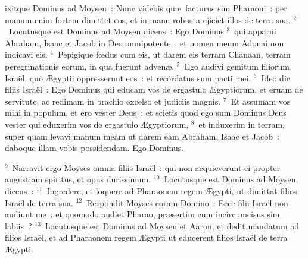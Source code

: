 \bchapter
{}ixitque Dominus ad Moysen~: Nunc videbis qu\ae\ facturus sim Pharaoni~: per manum enim fortem dimittet eos, et in manu robusta ejiciet illos de terra sua.
${}^{2}$~Locutusque est Dominus ad Moysen dicens~: Ego Dominus
${}^{3}$~qui apparui Abraham, Isaac et Jacob in Deo omnipotente~: et nomen meum Adonai non indicavi eis.
${}^{4}$~Pepigique fœdus cum eis, ut darem eis terram Chanaan, terram peregrinationis eorum, in qua fuerunt adven\ae .
${}^{5}$~Ego audivi gemitum filiorum Isra\"el, quo \AE gyptii oppresserunt eos~: et recordatus sum pacti mei.
${}^{6}$~Ideo dic filiis Isra\"el~: Ego Dominus qui educam vos de ergastulo \AE gyptiorum, et eruam de servitute, ac redimam in brachio excelso et judiciis magnis.
${}^{7}$~Et assumam vos mihi in populum, et ero vester Deus~: et scietis quod ego sum Dominus Deus vester qui eduxerim vos de ergastulo \AE gyptiorum,
${}^{8}$~et induxerim in terram, super quam levavi manum meam ut darem eam Abraham, Isaac et Jacob~: daboque illam vobis possidendam. Ego Dominus.


${}^{9}$~Narravit ergo Moyses omnia filiis Isra\"el~: qui non acquieverunt ei propter angustiam spiritus, et opus durissimum.
${}^{10}$~Locutusque est Dominus ad Moysen, dicens~:
${}^{11}$~Ingredere, et loquere ad Pharaonem regem \AE gypti, ut dimittat filios Isra\"el de terra sua.
${}^{12}$~Respondit Moyses coram Domino~: Ecce filii Isra\"el non audiunt me~: et quomodo audiet Pharao, pr\ae sertim cum incircumcisus sim labiis~?
${}^{13}$~Locutusque est Dominus ad Moysen et Aaron, et dedit mandatum ad filios Isra\"el, et ad Pharaonem regem \AE gypti ut educerent filios Isra\"el de terra \AE gypti.


